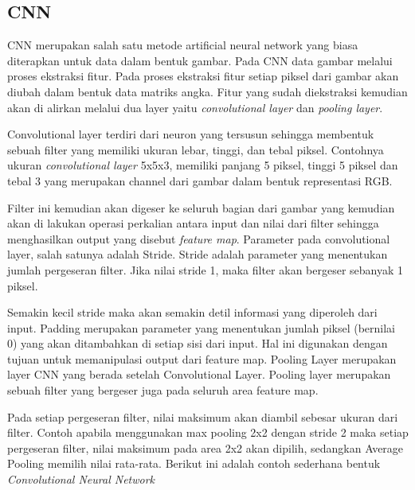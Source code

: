 \documentclass[./skripsi.tex]{subfiles}
\begin{document}
\subsection{CNN}\label{bab2:cnn}
\par CNN merupakan salah satu metode artificial neural network yang biasa diterapkan untuk data dalam bentuk gambar. Pada CNN data gambar melalui proses ekstraksi fitur. Pada proses ekstraksi fitur setiap piksel dari gambar akan diubah dalam bentuk data matriks angka. Fitur yang sudah diekstraksi kemudian akan di alirkan melalui dua layer yaitu \textit{convolutional layer} dan \textit{pooling layer}.
\par Convolutional layer terdiri dari neuron yang tersusun sehingga membentuk sebuah filter yang memiliki ukuran lebar, tinggi, dan tebal piksel. Contohnya ukuran \textit{convolutional layer} 5x5x3, memiliki panjang 5 piksel, tinggi 5 piksel dan tebal 3 yang merupakan channel dari gambar dalam bentuk representasi RGB.
\par Filter ini kemudian akan digeser ke seluruh bagian dari gambar yang kemudian akan di lakukan operasi perkalian antara input dan nilai dari filter sehingga menghasilkan output yang disebut \textit{feature map}. Parameter pada convolutional layer, salah satunya adalah Stride. Stride adalah parameter yang menentukan jumlah pergeseran filter. Jika nilai stride 1, maka filter akan bergeser sebanyak 1 piksel.
\par Semakin kecil stride maka akan semakin detil informasi yang diperoleh dari input. Padding merupakan parameter yang menentukan jumlah piksel (bernilai 0) yang akan ditambahkan di setiap sisi dari input. Hal ini digunakan dengan tujuan untuk memanipulasi output dari feature map. Pooling Layer merupakan layer CNN yang berada setelah Convolutional Layer. Pooling layer merupakan sebuah filter yang bergeser juga pada seluruh area feature map.
\par Pada setiap pergeseran filter, nilai maksimum akan diambil sebesar ukuran dari filter. Contoh apabila menggunakan max pooling 2x2 dengan stride 2
maka setiap pergeseran filter, nilai maksimum pada area 2x2 akan dipilih, sedangkan Average Pooling memilih nilai rata-rata. Berikut ini adalah contoh sederhana bentuk \textit{Convolutional Neural Network}
\end{document}

